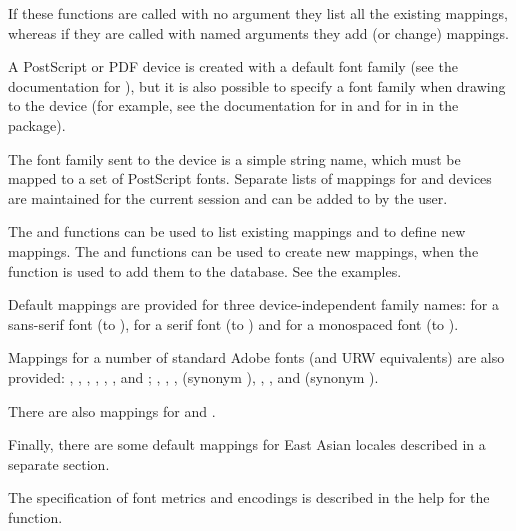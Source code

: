 \begin{Details}\relax
If these functions are called with no argument they list all the
existing mappings, whereas if they are called with named arguments
they add (or change) mappings.

A PostScript or PDF device is created with a default font family (see the
documentation for ), but it is also possible
to specify a font family when drawing to the device (for example, see
the documentation for  in  and for
 in  in the  package).

The font family sent to the device is a simple string name, which must be
mapped to a set of PostScript fonts.  Separate lists of mappings for
 and  devices are  maintained for the
current \R{} session and can be added to by the user.

The  and  functions can be used
to list existing mappings and to define new mappings.  The
 and  functions can be
used to create new mappings, when the  function is used
to add them to the database.  See the examples.

Default mappings are provided for three device-independent family
names:  for a sans-serif font (to ),
 for a serif font (to ) and 
for a monospaced font (to ).

Mappings for a number of standard Adobe fonts (and URW equivalents)
are also provided: ,
, , ,
, ,
 and ;
, , ,
 (synonym ),
, ,  and
 (synonym ).

There are also mappings for  and
.

Finally, there are some default mappings for East Asian locales
described in a separate section.

The specification of font metrics and encodings is described in the help
for the  function.


\end{Details}

